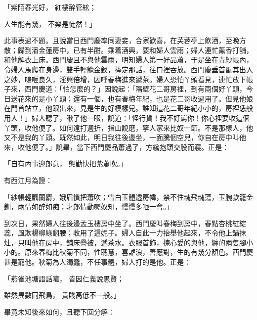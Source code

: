 「紫陌春光好，  紅樓醉管絃；

人生能有幾，  不樂是徒然！」

此事表過不題。且說當日西門慶率同妻妾，合家歡喜，在芙蓉亭上飲酒，至晚方散；歸到潘金蓮房中，已有半酣。乘着酒興，要和婦人雲雨；婦人連忙薰香打舖，和他解衣上床。西門慶且不與他雲雨，明知婦人第一好品蕭，于是坐在青紗帳內，令婦人馬爬在身邊，雙手輕籠金釵，捧定那話，往口裡吞放。西門慶垂首翫其出入之妙，嗚咂良久，淫興倍增，因呼春梅進來遞茶。婦人恐怕丫頭看見，連忙放下帳子來，西門慶道：「怕怎麼的？」因說起：「隔壁花二哥房裡，到有兩個好丫頭，今日送花來的是小丫頭；還有一個，也有春梅年紀，也是花二哥收過用了。但見他娘在門首站立，他跟出來，見是生的好模樣兒。誰知這花二哥年紀小小的，房裡恁般用人！」婦人聽了，瞅了他一眼，說道：「怪行貨！我不好罵你！你心裡要收這個丫頭，收他便了。如何遠打週折，指山說磨，拏人家來比奴一節。不是那樣人，他又不是我的丫頭。既然如此，明日我往後邊坐，一面騰個空兒，你自在房中叫他來，收他便了。」說畢，當下西門慶品蕭過了，方纔抱頭交股而寢。正是：

「自有內事迎郎意，  慇勤快把紫蕭吹。」

有西江月為證：

「紗帳輕飄蘭麝，娥眉慣把蕭吹；雪白玉體透房幃，禁不住魂飛魂蕩，玉腕款籠金釧，兩情如醉如痴；才郎情動囑奴知，慢慢多咂一會。」

到次日，果然婦人往後邊孟玉樓房中坐了。西門慶叫春梅到房中，春點杏桃紅綻蕊，風欺楊柳綠翻腰；收用了這妮子。婦人自此一力抬舉他起來，不令他上鍋抹灶，只叫他在房中，舖床疊被，遞茶水。衣服首飾，揀心愛的與他，纏的兩隻腳小小的。原來春梅比秋菊不同，性聰慧，喜謔浪，善應對，生的有幾分顏色。西門慶甚是寵他。秋菊為人濁蠢，不任事體，婦人打的是他。正是：

「燕雀池塘語話喧，  皆因仁義說愚賢；

雖然異數同飛鳥，  貴賤高低不一般。」

畢竟未知後來如何，且聽下回分解：
